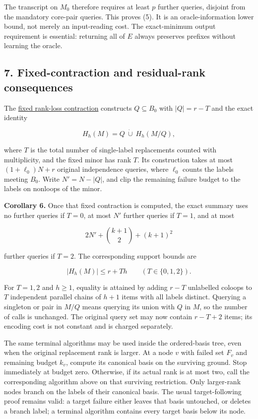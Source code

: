 The transcript on \(M_0\) therefore requires at least \(p\) further queries, disjoint from the mandatory core-pair queries. This proves (5). It is an oracle-information lower bound, not merely an input-reading cost. The exact-minimum output requirement is essential: returning all of \(E\) always preserves prefixes without learning the oracle.

\hypertarget{af-b41875cb6e-fixed-contraction-and-residual-rank-consequences}{%
\subsection{7. Fixed-contraction and residual-rank consequences}\label{af-b41875cb6e-fixed-contraction-and-residual-rank-consequences}}

The \href{https://github.com/icekylinx/algorithm-frontier/blob/main/problems/matroid-failure-summaries/manuscripts/rank-loss-contraction-for-prefix-summaries.md}{fixed rank-loss contraction} constructs \(Q\subseteq B_0\) with \(|Q|=r-T\) and the exact identity

\[
H_h(M)=Q\ \dot\cup\ H_h(M/Q),
\tag{9}
\]

where \(T\) is the total number of single-label replacements counted with multiplicity, and the fixed minor has rank \(T\). Its construction takes at most \((1+\ell_0)N+r\) original independence queries, where \(\ell_0\) counts the labels meeting \(B_0\). Write \(N'=N-|Q|\), and clip the remaining failure budget to the labels on nonloops of the minor.

\textbf{Corollary 6.} Once that fixed contraction is computed, the exact summary uses no further queries if \(T=0\), at most \(N'\) further queries if \(T=1\), and at most

\[
2N'+\binom{k+1}{2}+(k+1)^2
\tag{10}
\]

further queries if \(T=2\). The corresponding support bounds are

\[
|H_h(M)|\le r+Th\qquad(T\in\{0,1,2\}).
\tag{11}
\]

For \(T=1,2\) and \(h\ge1\), equality is attained by adding \(r-T\) unlabelled coloops to \(T\) independent parallel chains of \(h+1\) items with all labels distinct. Querying a singleton or pair in \(M/Q\) means querying its union with \(Q\) in \(M\), so the number of calls is unchanged. The original query set may now contain \(r-T+2\) items; its encoding cost is not constant and is charged separately.

The same terminal algorithms may be used inside the ordered-basis tree, even when the original replacement rank is larger. At a node \(v\) with failed set \(F_v\) and remaining budget \(k_v\), compute its canonical basis on the surviving ground. Stop immediately at budget zero. Otherwise, if its actual rank is at most two, call the corresponding algorithm above on that surviving restriction. Only larger-rank nodes branch on the labels of their canonical basis. The usual target-following proof remains valid: a target failure either leaves that basis untouched, or deletes a branch label; a terminal algorithm contains every target basis below its node.

